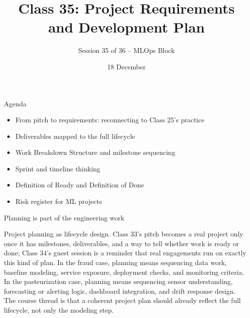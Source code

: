 

\title{Class 35: Project Requirements and Development Plan}
\subtitle{Session 35 of 36 -- MLOps Block}
\author{\coursename}
\date{18 December}



\frame{\titlepage \coursefooter}

\begin{frame}{Agenda}
\begin{itemize}
\item From pitch to requirements: reconnecting to Class 25's practice
\item Deliverables mapped to the full lifecycle
\item Work Breakdown Structure and milestone sequencing
\item Sprint and timeline thinking
\item Definition of Ready and Definition of Done
\item Risk register for ML projects
\end{itemize}
\coursefooter
\end{frame}

\begin{frame}{Planning is part of the engineering work}
\coursefooter
\end{frame}

\coursecontextframe
{Project planning as lifecycle design.}
{Class 33's pitch becomes a real project only once it has milestones, deliverables, and a way to tell whether work is ready or done; Class 34's guest session is a reminder that real engagements run on exactly this kind of plan.}
{In the fraud case, planning means sequencing data work, baseline modeling, service exposure, deployment checks, and monitoring criteria.}
{In the pasteurization case, planning means sequencing sensor understanding, forecasting or alerting logic, dashboard integration, and drift response design.}
{The course thread is that a coherent project plan should already reflect the full lifecycle, not only the modeling step.}

